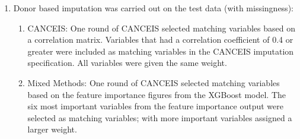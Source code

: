 \documentclass[]{book}
\providecommand{\tightlist}{%
  \setlength{\itemsep}{0pt}\setlength{\parskip}{0pt}}
\begin{document}
\begin{enumerate}
\def\labelenumi{\arabic{enumi})}
\setcounter{enumi}{6}
\tightlist
\item
  Donor based imputation was carried out on the test data (with
  missingness):

  \begin{enumerate}
  \def\labelenumii{\roman{enumii})}
  \tightlist
  \item
    CANCEIS: One round of CANCEIS selected matching variables based on a
    correlation matrix. Variables that had a correlation coefficient of
    \textbar{}0.4\textbar{} or greater were included as matching
    variables in the CANCEIS imputation specification. All variables
    were given the same weight.\\
  \item
    Mixed Methods: One round of CANCEIS selected matching variables
    based on the feature importance figures from the XGBoost model. The
    six most important variables from the feature importance output were
    selected as matching variables; with more important variables
    assigned a larger weight.
  \end{enumerate}
\end{enumerate}
\end{document}
